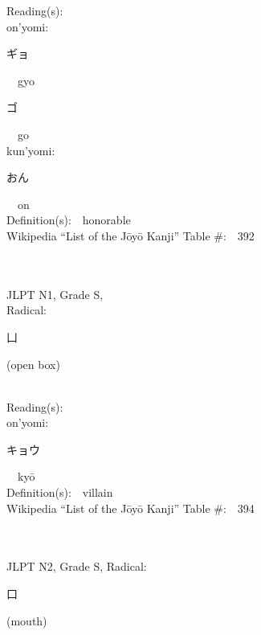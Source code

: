 \begin{multicols}{2}
Reading(s):\ \ \\
{\hspace*{1em}}on'yomi:\ \ \\
{\hspace*{2em}}{\begin{CJK}{UTF8}{min} ギョ \end{CJK}}\ \ gyo\ \ \\
{\hspace*{2em}}{\begin{CJK}{UTF8}{min} ゴ \end{CJK}}\ \ go\ \ \\
{\hspace*{1em}}kun'yomi:\ \ \\
{\hspace*{2em}}{\begin{CJK}{UTF8}{min} おん \end{CJK}}\ \ on\ \ \\
Definition(s):\ \ honorable \\
Wikipedia ``List of the J\=oy\=o Kanji'' Table \#:\ \ 392 \\
\ \ \\
{\fontsize{34pt}{40pt}  }\ \ \\
{JLPT N1, Grade S, \\Radical:\ \ {\begin{CJK}{UTF8}{min} 凵 \end{CJK}} (open box) } \\
Reading(s):\ \ \\
{\hspace*{1em}}on'yomi:\ \ \\
{\hspace*{2em}}{\begin{CJK}{UTF8}{min} キョウ \end{CJK}}\ \ ky\=o\ \ \\
Definition(s):\ \ villain \\
Wikipedia ``List of the J\=oy\=o Kanji'' Table \#:\ \ 394 \\
\ \ \\
{\fontsize{34pt}{40pt}  }\ \ \\  %
{JLPT N2, Grade S, Radical:\ \ {\begin{CJK}{UTF8}{min} 口 \end{CJK}} (mouth) } \\

\end{multicols}
